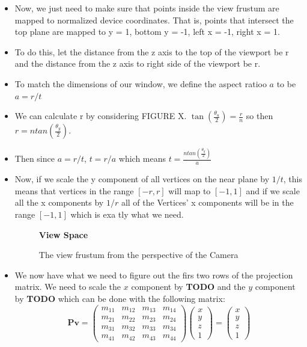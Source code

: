\documentclass{article}
\begin{document}
\begin{itemize}
	\item Now, we just need to make sure that points inside the view frustum are mapped to normalized device coordinates. That is, points that intersect the top plane are mapped to y = 1, bottom y = -1, left x = -1, right x = 1.

	\item To do this, let the distance from the z axis to the top of the viewport be r and the distance from the z axis to right side of the viewport be r.

	\item To match the dimensions of our window, we define the aspect ratioo $a$ to be $a = r/t$

	\item We can calculate r by considering FIGURE X. $\tan(\frac{\theta_u}{2}) = \frac{r}{n}$ so then $r = ntan(\frac{\theta_y}{2})$. 

	\item Then since $a = r/t$, $t = r/a$ which means $t = \frac{ntan(\frac{\theta_y}{2})}{a}$

	\item Now, if we scale the y component of all vertices on the near plane by $1/t$, this means that vertices in the range $[-r,r]$ will map to $[-1,1]$ and if we scale all the x components by $1/r$ all of the Vertices' x components will be in the range $[-1,1]$ which is exa tly what we need.
\begin{figure}[h!]
	\centering
	\textbf{View Space}\\[0.5em]%
	\resizebox{0.5\textwidth}{!}{%
		
	}
	\caption{The view frustum from the perspective of the Camera}\label{fig:frustum-front}
\end{figure}

	
\item We now have what we need to figure out the firs two rows of the projection matrix. We need to scale the $x$ component by \textbf{TODO} and the $y$ component by \textbf{TODO} which can be done with the following matrix:
\[
\mathbf{Pv} =
\begin{pmatrix}
m_{11} & m_{12} & m_{13} & m_{14} \\
m_{21} & m_{22} & m_{23} & m_{24} \\
m_{31} & m_{32} & m_{33} & m_{34} \\
m_{41} & m_{42} & m_{43} & m_{44}
\end{pmatrix}%
\begin{pmatrix}
x \\ y \\ z \\ 1
\end{pmatrix}
=
\begin{pmatrix}
x\\y\\z\\1
\end{pmatrix}
\]

\end{itemize}
\end{document}
